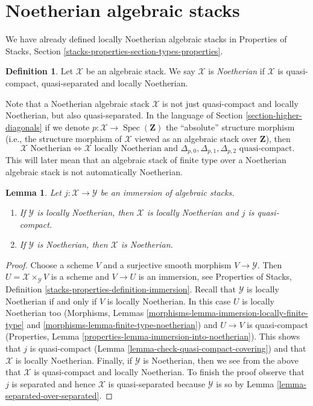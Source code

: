 \documentclass{stacks-project}
\theoremstyle{plain}
\newtheorem{lemma}[subsection]{Lemma}
\theoremstyle{definition}
\newtheorem{definition}[subsection]{Definition}
\theoremstyle{remark}
\numberwithin{equation}{subsection}
\def\Spec{\mathop{\mathrm{Spec}}}
\begin{document}
\section{Noetherian algebraic stacks}
\label{section-noetherian}

\noindent
We have already defined locally Noetherian algebraic stacks in
Properties of Stacks, Section \ref{stacks-properties-section-types-properties}.

\begin{definition}
\label{definition-noetherian}
Let $\mathcal{X}$ be an algebraic stack. We say $\mathcal{X}$ is
{\it Noetherian} if $\mathcal{X}$ is quasi-compact, quasi-separated
and locally Noetherian.
\end{definition}

\noindent
Note that a Noetherian algebraic stack $\mathcal{X}$ is not just quasi-compact
and locally Noetherian, but also quasi-separated. In the language of
Section \ref{section-higher-diagonals}
if we denote $p : \mathcal{X} \to \Spec(\mathbf{Z})$ the
``absolute'' structure morphism (i.e., the structure morphism of
$\mathcal{X}$ viewed as an algebraic stack over $\mathbf{Z}$), then
$$
\mathcal{X}\text{ Noetherian}
\Leftrightarrow
\mathcal{X}\text{ locally Noetherian and }
\Delta_{p, 0}, \Delta_{p, 1}, \Delta_{p, 2}
\text{ quasi-compact}.
$$
This will later mean that an algebraic stack of finite type over a
Noetherian algebraic stack is not automatically Noetherian.

\begin{lemma}
\label{lemma-locally-closed-in-noetherian}
Let $j : \mathcal{X} \to \mathcal{Y}$ be an immersion of algebraic stacks.
\begin{enumerate}
\item If $\mathcal{Y}$ is locally Noetherian, then
$\mathcal{X}$ is locally Noetherian and $j$ is quasi-compact.
\item If $\mathcal{Y}$ is Noetherian, then $\mathcal{X}$ is Noetherian.
\end{enumerate}
\end{lemma}

\begin{proof}
Choose a scheme $V$ and a surjective smooth morphism $V \to \mathcal{Y}$.
Then $U = \mathcal{X} \times_\mathcal{Y} V$ is a scheme and
$V \to U$ is an immersion, see
Properties of Stacks, Definition \ref{stacks-properties-definition-immersion}.
Recall that $\mathcal{Y}$ is locally Noetherian if and only if $V$
is locally Noetherian. In this case $U$ is locally Noetherian too
(Morphisms, Lemmas \ref{morphisms-lemma-immersion-locally-finite-type} and
\ref{morphisms-lemma-finite-type-noetherian}) and $U \to V$ is quasi-compact
(Properties, Lemma \ref{properties-lemma-immersion-into-noetherian}).
This shows that $j$ is quasi-compact
(Lemma \ref{lemma-check-quasi-compact-covering})
and that $\mathcal{X}$ is locally Noetherian.
Finally, if $\mathcal{Y}$ is Noetherian, then we see from the above
that $\mathcal{X}$ is quasi-compact and locally Noetherian.
To finish the proof observe that $j$ is separated and hence
$\mathcal{X}$ is quasi-separated because $\mathcal{Y}$ is so by
Lemma \ref{lemma-separated-over-separated}.
\end{proof}
\end{document}
